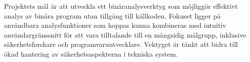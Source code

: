 Projektets mål är att utveckla ett binäranalysverktyg som möjliggör effektivt
analys av binära program utan tillgång till källkoden. Fokuset ligger på
användbara analysfunktioner som hoppas kunna kombineras med intuitiv
användargränssnitt för att vara tilltalande till en mångsidig målgrupp,
inklusive säkerhetsforskare och programvaruutvecklare. Vektyget är tänkt att
bidra till ökad hantering av säkerhetsaspekterna i tekniska system.
